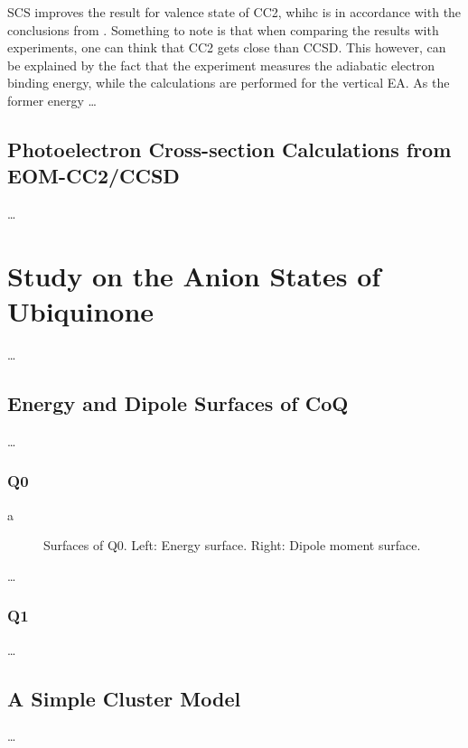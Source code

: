 SCS improves the result for valence state of CC2, whihc is in accordance with the conclusions from \cite{paran2024performance}. Something to note is that when comparing the results with experiments, one can think that CC2 gets close than CCSD. This however, can be explained by the fact that the experiment measures the adiabatic electron binding energy, while the calculations are performed for the vertical EA. As the former energy 
\ldots
\subsection{Photoelectron Cross-section Calculations from EOM-CC2/CCSD}

\ldots
\section{Study on the Anion States of Ubiquinone}

\ldots
\subsection{Energy and Dipole Surfaces of CoQ}

\ldots
\subsubsection{Q0}
a

\begin{figure}[h!]
  \centering
  \begin{minipage}[]{0.49\textwidth}
    \centering
    \small
    
  \end{minipage}%
  \hfill
  \begin{minipage}[]{0.47\textwidth}
    \centering
    \small
    
  \end{minipage}
  \label{fig:Q0_surf}
  \caption[Surfaces of Q0]{Surfaces of Q0. Left: Energy surface. Right: Dipole moment surface.}
\end{figure}

\ldots
\subsubsection{Q1}

\ldots
\subsection{A Simple Cluster Model}
\ldots

